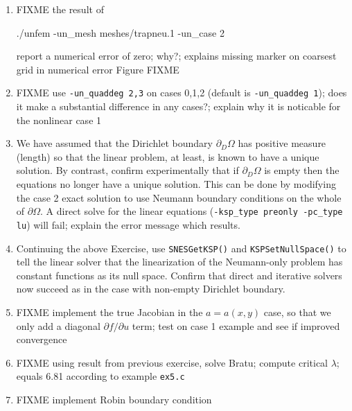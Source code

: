 \begin{enumerate}
\item FIXME the result of
\begin{cline}
./unfem -un_mesh meshes/trapneu.1 -un_case 2
\end{cline}
report a numerical error of zero; why?; explains missing marker on coarsest grid in numerical error Figure FIXME
\item FIXME use \texttt{-un\_quaddeg 2,3} on cases 0,1,2 (default is \texttt{-un\_quaddeg 1}); does it make a substantial difference in any cases?; explain why it is noticable for the nonlinear case 1
\item \label{exer:un:allneumannfailure}  We have assumed that the Dirichlet boundary $\partial_D \Omega$ has positive measure (length) so that the linear problem, at least, is known to have a unique solution.  By contrast, confirm experimentally that if $\partial_D\Omega$ is empty then the equations no longer have a unique solution.  This can be done by modifying the case 2 exact solution to use Neumann boundary conditions on the whole of $\partial \Omega$.  A direct solve for the linear equations (\texttt{-ksp\_type preonly -pc\_type lu}) will fail; explain the error message which results.
\item \label{exer:un:allneumannresolution}  Continuing the above Exercise, use \texttt{SNESGetKSP()} and \texttt{KSPSetNullSpace()} to tell the linear solver that the linearization of the Neumann-only problem has constant functions as its null space.  Confirm that direct and iterative solvers now succeed as in the case with non-empty Dirichlet boundary.
\item \label{exer:un:truejacobian} FIXME implement the true Jacobian in the $a=a(x,y)$ case, so that we only add a diagonal $\partial f/\partial u$ term; test on case 1 example and see if improved \pSNES convergence
\item \label{exer:un:bratu} FIXME using result from previous exercise, solve Bratu; compute critical $\lambda$; equals 6.81 according to \pSNES example \texttt{ex5.c}
\item \label{exer:un:robin} FIXME implement Robin boundary condition
\end{enumerate}

